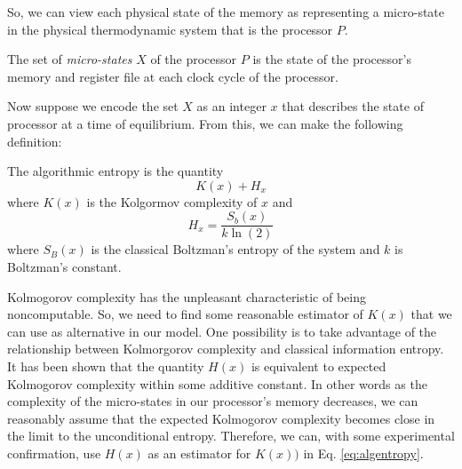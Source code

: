 \documentclass[times, 10pt,onecolumn]{article}
\begin{document}
So, we can view each physical state of the memory as representing a
micro-state in the physical thermodynamic system that is the processor $P$.
\begin{defn}
  The set of \textit{micro-states} ${X}$ of the processor $P$ is the state of
  the processor's memory and register file at each clock cycle of the processor.
\end{defn}
Now suppose we encode the set ${X}$ as an integer $x$ that describes the
state of processor at a time of equilibrium.   From this, we can make
the following definition:
\begin{defn}
  The algorithmic entropy is the quantity 
  \begin{equation}
    \label{eq:algentropy}
    K(x) + H_{x}    
  \end{equation}
  where $K(x)$  is the Kolgormov complexity of $x$ and 
  \begin{equation}
    \label{eq:boltzentropy}
    H_{x}=\frac{S_{b}(x)}{k\ln(2)}
  \end{equation}
  where $S_{B}(x)$ is the classical Boltzman's entropy of the system and
  $k$ is Boltzman's constant.
\end{defn}

Kolmogorov complexity has the unpleasant characteristic of being
noncomputable. So, we need to find some reasonable estimator of $K(x)$
that we can use as alternative in our model.   One possibility is to
take advantage of the relationship between Kolmorgorov complexity and
classical information entropy.   It has been shown that the quantity
$H(x)$ is equivalent to expected Kolmogorov complexity within some
additive constant.  In other words as the complexity of the micro-states
in our processor's memory decreases, we can reasonably assume that the
expected Kolmogorov complexity becomes close in the limit to the
unconditional entropy.  Therefore, we can, with some experimental
confirmation, use $H(x)$ as an estimator for $K(x))$ in Eq. \ref{eq:algentropy}.
\end{document}
